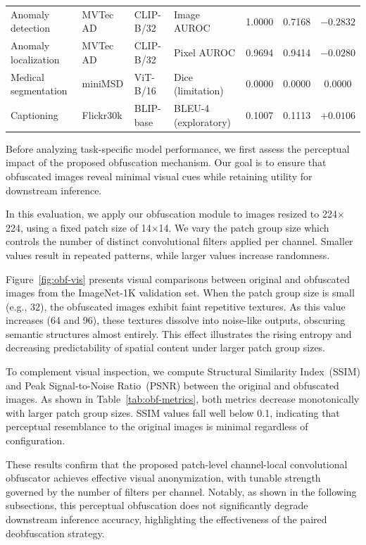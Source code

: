\documentclass{ieeeaccess}
\newcommand{\rev}[1]{{\color{black}#1}}
\begin{document}
\begin{table}[t]
\begin{tabular}{p{} p{} p{} p{} c c c}
\rev{Anomaly detection} & \rev{MVTec AD} & \rev{CLIP-B/32} & \rev{Image AUROC} & \rev{1.0000} & \rev{0.7168} & \rev{$-0.2832$} \\
\rev{Anomaly localization} & \rev{MVTec AD} & \rev{CLIP-B/32} & \rev{Pixel AUROC} & \rev{0.9694} & \rev{0.9414} & \rev{$-0.0280$} \\
\midrule
\rev{Medical segmentation} & \rev{miniMSD} & \rev{ViT-B/16} & \rev{Dice (limitation)} & \rev{0.0000} & \rev{0.0000} & \rev{0.0000} \\
\rev{Captioning} & \rev{Flickr30k} & \rev{BLIP-base} & \rev{BLEU-4 (exploratory)} & \rev{0.1007} & \rev{0.1113} & \rev{$+0.0106$} \\
\bottomrule
\end{tabular}
\end{table}


Before analyzing task-specific model performance, we first assess the perceptual impact of the proposed obfuscation mechanism. Our goal is to ensure that obfuscated images reveal minimal visual cues while retaining utility for downstream inference.

In this evaluation, we apply our obfuscation module to images resized to 224$\times$224, using a fixed patch size of 14$\times$14. We vary the patch group size which controls the number of distinct convolutional filters applied per channel. Smaller values result in repeated patterns, while larger values increase randomness.

Figure~\ref{fig:obf-vis} presents visual comparisons between original and obfuscated images from the ImageNet-1K validation set. When the patch group size is small (e.g., 32), the obfuscated images exhibit faint repetitive textures. As this value increases (64 and 96), these textures dissolve into noise-like outputs, obscuring semantic structures almost entirely. This effect illustrates the rising entropy and decreasing predictability of spatial content under larger patch group sizes.

To complement visual inspection, we compute Structural Similarity Index~(SSIM) and Peak Signal-to-Noise Ratio~(PSNR) between the original and obfuscated images. As shown in Table~\ref{tab:obf-metrics}, both metrics decrease monotonically with larger patch group sizes. SSIM values fall well below 0.1, indicating that perceptual resemblance to the original images is minimal regardless of configuration.

These results confirm that the proposed patch-level channel-local convolutional obfuscator achieves effective visual anonymization, with tunable strength governed by the number of filters per channel. Notably, as shown in the following subsections, this perceptual obfuscation does not significantly degrade downstream inference accuracy, highlighting the effectiveness of the paired deobfuscation strategy.
\end{document}
